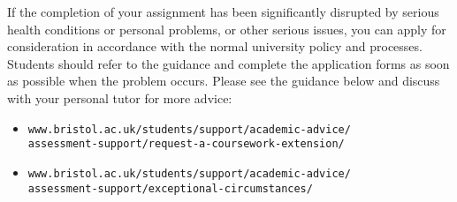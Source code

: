\documentclass[12pt]{article}
\begin{document}
If the completion of your assignment has been significantly disrupted
by serious health conditions or personal problems, or other serious
issues, you can apply for consideration in accordance with the normal
university policy and processes. Students should refer to the guidance
and complete the application forms as soon as possible when the
problem occurs. Please see the guidance below and discuss with your
personal tutor for more advice:
\begin{itemize}
\item \texttt{www.bristol.ac.uk/students/support/academic-advice/\\
  assessment-support/request-a-coursework-extension/}
\item \texttt{www.bristol.ac.uk/students/support/academic-advice/\\assessment-support/exceptional-circumstances/}
    \end{itemize}
\end{document}
